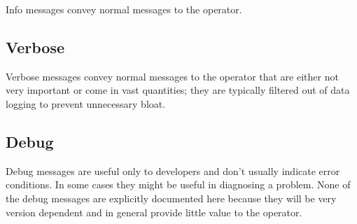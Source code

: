 Info messages convey normal messages to the operator.

\subsection{Verbose}

Verbose messages convey normal messages to the operator that are either not very important or come in vast quantities; they are typically filtered out of data logging to prevent unnecessary bloat.

\subsection{Debug}

Debug messages are useful only to developers and don't usually indicate error conditions.  
In some cases they might be useful in diagnosing a problem.
None of the debug messages are explicitly documented here because they will be very version dependent and in general provide little value to the operator.

